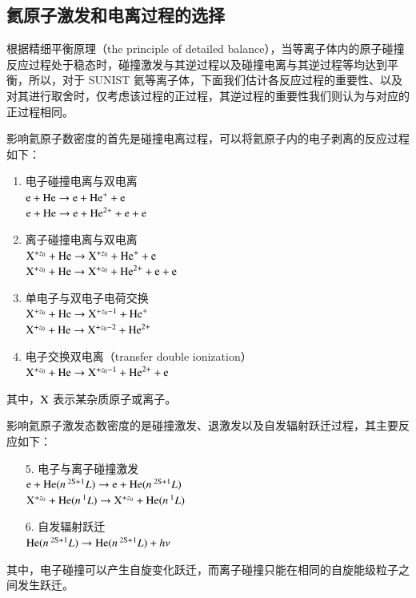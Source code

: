 
\subsection{氦原子激发和电离过程的选择}

根据精细平衡原理（the principle of detailed balance）\cite{Lieberman2005-book}，当等离子体内的原子碰撞反应过程处于稳态时，碰撞激发与其逆过程以及碰撞电离与其逆过程等均达到平衡，所以，对于 SUNIST 氦等离子体，下面我们估计各反应过程的重要性、以及对其进行取舍时，仅考虑该过程的正过程，其逆过程的重要性我们则认为与对应的正过程相同。

影响氦原子数密度的首先是碰撞电离过程，可以将氦原子内的电子剥离的反应过程如下\cite{Anderson1999:Thesis}：
\begin{enumerate}
  \item 电子碰撞电离与双电离\\
        ${\rm e}+{\rm He}\to {\rm e}+{\rm He}^+ + {\rm e}$\\
        ${\rm e}+{\rm He}\to {\rm e}+{\rm He}^{2+} + {\rm e} + {\rm e}$
  \item 离子碰撞电离与双电离\\
        ${\rm X}^{+z_0} + {\rm He} \to {\rm X}^{+z_0} + {\rm He}^+ + {\rm e}$\\
        ${\rm X}^{+z_0} + {\rm He} \to {\rm X}^{+z_0} + {\rm He}^{2+} + {\rm e} + {\rm e}$
  \item 单电子与双电子电荷交换\\
        ${\rm X}^{+z_0} + {\rm He} \to {\rm X}^{+z_0-1} + {\rm He}^+ $\\
        ${\rm X}^{+z_0} + {\rm He} \to {\rm X}^{+z_0-2} + {\rm He}^{2+}$
  \item 电子交换双电离（transfer double ionization）\\
        ${\rm X}^{+z_0} + {\rm He} \to {\rm X}^{+z_0-1} + {\rm He}^{2+} + {\rm e}$
\end{enumerate}
其中，${\rm X}$ 表示某杂质原子或离子。

影响氦原子激发态数密度的是碰撞激发、退激发以及自发辐射跃迁过程，其主要反应如下\cite{Anderson1999:Thesis}：
\begin{enumerate}
  \item[5.] 电子与离子碰撞激发\\
        ${\rm e}+{\rm He}(n\,^{\rm 2S+1}{L}) \to {\rm e}+{\rm He}(n\,^{\rm 2S+1}{L})$\\
        ${\rm X}^{+z_0} + {\rm He}(n\,^{1}L) \to {\rm X}^{+z_0} + {\rm He}(n\,^{1}L)$
  \item[6.] 自发辐射跃迁\\
        ${\rm He}(n\,^{\rm 2S+1}L) \to  {\rm He}(n\,^{\rm 2S+1}L) + h\nu$
\end{enumerate}
其中，电子碰撞可以产生自旋变化跃迁，而离子碰撞只能在相同的自旋能级粒子之间发生跃迁。

